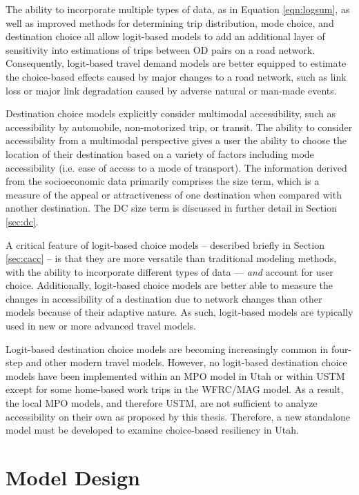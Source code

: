 The ability to incorporate multiple types of data, as in Equation \ref{eqn:logsum}, as well as improved methods
for determining trip distribution, mode choice, and destination choice all allow
logit-based models to add an additional layer of sensitivity into estimations of
trips between OD pairs on a road network. Consequently, logit-based travel
demand models are better equipped to estimate the choice-based effects caused
by major changes to a road network, such as link loss or major link degradation
caused by adverse natural or man-made events.

Destination choice models explicitly consider multimodal accessibility, such as accessibility by automobile,
non-motorized trip, or transit. The ability to consider accessibility from a
multimodal perspective gives a user the ability to choose the location of
their destination based on a variety of factors including mode accessibility
(i.e. ease of access to a mode of transport). The information
derived from the socioeconomic data primarily comprises the size term, which
is a measure of the appeal or attractiveness of one destination when compared with
another destination. The DC size term is discussed in further detail in
Section \ref{sec:dc}.

A critical feature of logit-based choice models – described briefly in Section
\ref{sec:cacc} – is that they are more versatile than traditional modeling
methods, with the ability to incorporate different types of data --- \textit{and}
account for user choice. Additionally, logit-based choice models are better
able to measure the changes in accessibility of a destination due to network
changes than other models because of their adaptive nature. As such, logit-based
models are typically used in new or more advanced travel models.

Logit-based destination choice models are becoming increasingly common in four-
step and other modern travel models. However, no logit-based destination
choice models have been implemented within an MPO model in Utah or within
USTM except for some home-based work trips in the WFRC/MAG model. As a result,
the local MPO models, and therefore USTM, are not sufficient to analyze
accessibility on their own as proposed by this thesis. Therefore, a new
standalone model must be developed to examine choice-based resiliency in Utah.

\section{Model Design} \label{Model Design}

